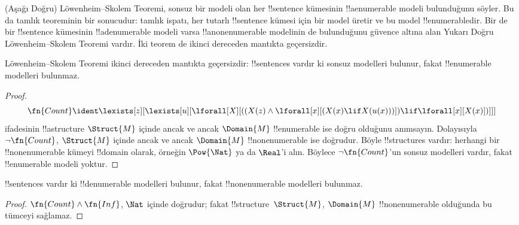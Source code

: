



\begin{explain}
(Aşağı Doğru) Löwenheim--Skolem Teoremi, sonsuz bir modeli olan her
!!{sentence} kümesinin !!a{enumerable} modeli bulunduğunu söyler. Bu da tamlık
teoreminin bir sonucudur: tamlık ispatı, her tutarlı !!{sentence} kümesi için
bir model üretir ve bu model !!{enumerable}{}dir. Bir de bir !!{sentence}
kümesinin !!a{denumerable} modeli varsa !!a{nonenumerable} modelinin de
bulunduğunu güvence altına alan Yukarı Doğru Löwenheim--Skolem Teoremi
vardır. İki teorem de ikinci dereceden mantıkta geçersizdir.
\end{explain}


\begin{thm}
 Löwenheim--Skolem Teoremi ikinci dereceden mantıkta
geçersizdir: !!{sentence}s vardır ki sonsuz modelleri bulunur, fakat
!!{enumerable} modelleri bulunmaz.
\end{thm}

\begin{proof}
\[
\fn{Count} \ident \lexists[z][\lexists[u][\lforall[X][((X(z) \land
      \lforall[x][(X(x) \lif X(u(x)))]) \lif \lforall[x][X(x)])]]]
\]
ifadesinin !!a{structure} $\Struct{M}$ içinde ancak ve ancak $\Domain{M}$
!!{enumerable} ise doğru olduğunu anımsayın. Dolayısıyla
$\lnot\fn{Count}$, $\Struct{M}$ içinde ancak ve ancak $\Domain{M}$
!!{nonenumerable} ise doğrudur. Böyle !!{structure}s vardır: herhangi bir
!!{nonenumerable} kümeyi !!{domain} olarak, örneğin $\Pow{\Nat}$ ya da
$\Real$'i alın. Böylece $\lnot\fn{Count}$'un sonsuz modelleri vardır, fakat
!!{enumerable} modeli yoktur.
\end{proof}

\begin{thm}
!!{sentence}s vardır ki !!{denumerable} modelleri bulunur, fakat
!!{nonenumerable} modelleri bulunmaz.
\end{thm}

\begin{proof}
$\fn{Count}\land\fn{Inf}$, $\Nat$ içinde doğrudur; fakat
!!{structure}~$\Struct{M}$, $\Domain{M}$ !!{nonenumerable} olduğunda bu
tümceyi sağlamaz.
\end{proof}


